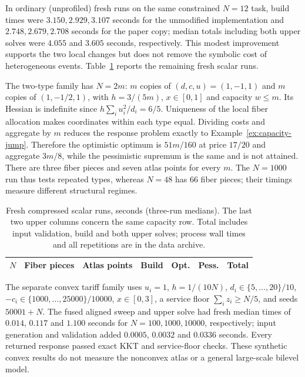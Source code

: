 In ordinary (unprofiled) fresh runs on the same constrained $N=12$ task,
build times were $3.150,2.929,3.107$ seconds for the unmodified
implementation and $2.748,2.679,2.708$ seconds for the paper copy; median
totals including both upper solves were $4.055$ and $3.605$ seconds,
respectively.
This modest improvement supports the two local changes but does not remove the
symbolic cost of heterogeneous events. Table~\ref{tab:scalar-scaling} reports
the remaining fresh scalar runs.

The two-type family has $N=2m$: $m$ copies of $(d,c,u)=(1,-1,1)$ and $m$
copies of $(1,-1/2,1)$, with $h=3/(5m)$, $x\in[0,1]$ and capacity $w\le m$.
Its Hessian is indefinite since $h\sum_i u_i^2/d_i=6/5$.
Uniqueness of the local fiber allocation makes coordinates within each type
equal. Dividing costs and aggregate by $m$ reduces the response problem exactly
to Example~\ref{ex:capacity-jump}. Therefore the optimistic optimum is
$51m/160$ at price $17/20$ and aggregate $3m/8$, while the pessimistic
supremum is the same and is not attained. There are three fiber pieces and seven
atlas points for every $m$. The $N=1000$ run thus tests repeated types, whereas
$N=48$ has 66 fiber pieces; their timings measure different structural regimes.

\begin{table}[t]
\centering\small
\caption{Fresh compressed scalar runs, seconds (three-run medians).
The last two upper columns concern the same capacity row. Total includes input
validation, build and both upper solves; process wall times and all repetitions
are in the data archive.}
\label{tab:scalar-scaling}
\begin{tabular}{lrrrrrr}\toprule
$N$ & Fiber pieces & Atlas points & Build & Opt. & Pess. & Total\\\midrule
\end{tabular}
\end{table}

The separate convex tariff family uses $u_i=1$, $h=1/(10N)$,
$d_i\in\{5,\ldots,20\}/10$, $-c_i\in\{1000,\ldots,25000\}/10000$,
$x\in[0,3]$, a service floor $\sum_i z_i\ge N/5$, and seeds $50001+N$.
The fused aligned sweep and upper solve had fresh median times of
$0.014$, $0.117$ and $1.100$ seconds for $N=100,1000,10000$, respectively;
input generation and validation added $0.0005$, $0.0032$ and $0.0336$ seconds.
Every returned response passed exact KKT and service-floor checks. These
synthetic convex results do not measure the nonconvex atlas or a general
large-scale bilevel model.


